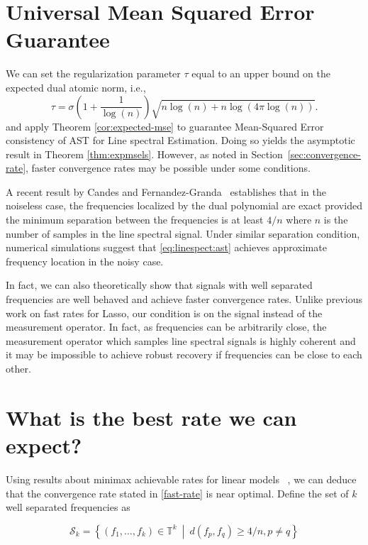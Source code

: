 \section{Universal Mean Squared Error Guarantee}

We can set the regularization parameter $\tau$ equal to an upper bound on the
expected dual atomic norm, i.e.,
\begin{equation}
\label{eq:tau}
\tau = \sigma\left(1  +  \frac{1}{\log(n)}\right)\sqrt{n \log(n) + n\log(4\pi\log(n))}.
\end{equation}
and apply Theorem \ref{cor:expected-mse} to guarantee Mean-Squared Error
consistency of AST for Line spectral Estimation. Doing so yields the asymptotic
result in Theorem \ref{thm:expmsels}. However, as noted in
Section~\ref{sec:convergence-rate}, faster convergence rates may be possible
under some conditions.

A recent result by Candes and Fernandez-Granda~\cite{CandesGranda} establishes
that in the noiseless case, the frequencies localized by the dual polynomial are
exact provided the minimum separation between the frequencies is at least $4/n$
where $n$ is the number of samples in the line spectral signal. Under similar
separation condition, numerical simulations suggest that \eqref{eq:linespect:ast} achieves
approximate frequency location in the noisy case.

In fact, we can also theoretically show that signals with well separated
frequencies are well behaved and achieve faster convergence rates. Unlike
previous work on fast rates for Lasso, our condition is on the signal instead of
the measurement operator. In fact, as frequencies can be arbitrarily close, the
measurement operator which samples line spectral signals is highly coherent and
it may be impossible to achieve robust recovery if frequencies can be close to
each other.



\section{What is the best rate we can expect?}\label{sec:minimax}

Using results about minimax achievable rates for linear models~
\cite{cd_minimax,rw_minimax}, we can deduce that the convergence rate stated in
\eqref{fast-rate} is near optimal. Define the set of $k$ well separated
frequencies as

\[
\mathcal{S}_k = \left\{(f_1, \dots, f_k) \in \mathbb{T}^k ~\middle|~  d(f_p, f_q) \geq 4/n, p \neq q \right\}
\]

